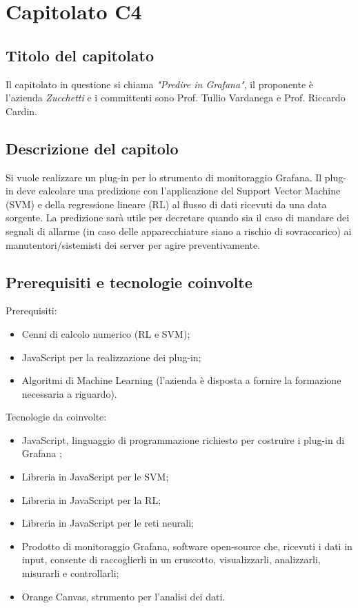 \section{Capitolato C4}
\subsection{Titolo del capitolato}
Il capitolato in questione si chiama \textit{"Predire in Grafana"}, il proponente è l'azienda \textit{Zucchetti} e i committenti sono Prof. Tullio Vardanega e Prof. Riccardo Cardin.

\subsection{Descrizione del capitolo}
Si vuole realizzare un plug-in per lo strumento di monitoraggio Grafana. Il plug-in deve calcolare una predizione con l'applicazione del Support Vector Machine (SVM) e della regressione lineare (RL) al flusso di dati ricevuti da una data sorgente. La predizione sarà utile per decretare quando sia il caso di mandare dei segnali di allarme (in caso delle apparecchiature siano a rischio di sovraccarico) ai manutentori/sistemisti dei server per agire preventivamente.

\subsection{Prerequisiti e tecnologie coinvolte}
Prerequisiti:
\begin{itemize}
\item Cenni di calcolo numerico (RL e SVM);
\item JavaScript per la realizzazione dei plug-in;
\item Algoritmi di Machine Learning (l'azienda \`e disposta a fornire la formazione necessaria a riguardo).
\end{itemize}
Tecnologie da coinvolte:
\begin{itemize}
\item JavaScript, linguaggio di programmazione richiesto per costruire i plug-in di Grafana ;
\item Libreria in JavaScript per le SVM;
\item Libreria in JavaScript per la RL;
\item Libreria in JavaScript per le reti neurali;
\item Prodotto di monitoraggio Grafana, software open-source che, ricevuti i dati in input, consente di raccoglierli in un cruscotto, visualizzarli, analizzarli, misurarli e controllarli;
\item Orange Canvas, strumento per l'analisi dei dati.
\end{itemize}



